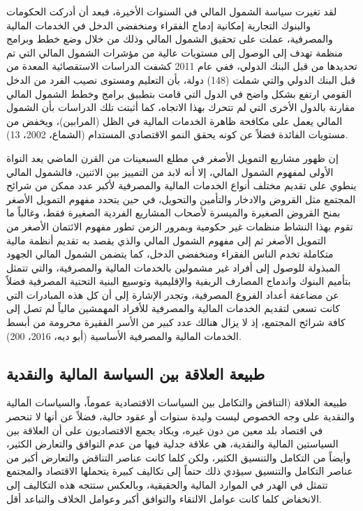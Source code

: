 \documentclass[10pt,a4paper]{report}
\begin{document}
\begin{doublespacing}
لقد تغيرت سياسة الشمول المالي في السنوات الأخيرة، فبعد أن أدركت الحكومات والبنوك التجارية إمكانية إدماج الفقراء ومنخفضي الدخل في الخدمات المالية والمصرفية، عملت على تحقيق الشمول المالي وذلك من خلال وضع خطط وبرامج منظمة تهدف إلى الوصول إلى مستويات عالية من مؤشرات الشمول المالي التي تم تحديدها من قبل البنك الدولي، ففي عام 2011 كشفت الدراسات الاستقصائية المعدة من قبل البنك الدولي والتي شملت (148) دولة، بأن التعليم ومستوى نصيب الفرد من الدخل القومي ارتفع بشكل واضح في الدول التي قامت بتطبيق برامج وخطط الشمول المالي مقارنة بالدول الأخرى التي لم تتحرك بهذا الاتجاه، كما أثبتت تلك الدراسات بأن الشمول المالي يعمل على مكافحة ظاهرة الخدمات المالية في الظل (المرابين)، ويخفض من مستويات الفائدة فضلاً عن كونه يحقق النمو الاقتصادي المستدام ({الشماع، 2002، 13}).

إن ظهور مشاريع التمويل الأصغر في مطلع السبعينات من القرن الماضي يعد النواة الأولى لمفهوم الشمول المالي، إلا أنه لابد من التمييز بين الاثنين، فالشمول المالي ينطوي على تقديم مختلف أنواع الخدمات المالية والمصرفية لأكبر عدد ممكن من شرائح المجتمع مثل القروض والادخار والتأمين والتحويل، في حين يتحدد مفهوم التمويل الأصغر بمنح القروض الصغيرة والميسرة لأصحاب المشاريع الفردية الصغيرة فقط، وغالباً ما تقوم بهذا النشاط منظمات غير حكومية وبمرور الزمن تطور مفهوم الائتمان الأصغر من التمويل الأصغر ثم إلى مفهوم الشمول المالي والذي يقصد به تقديم أنظمة مالية متكاملة تخدم الناس الفقراء ومنخفضي الدخل، كما يتضمن الشمول المالي الجهود المبذولة للوصول إلى أفراد غير مشمولين بالخدمات المالية والمصرفية، والتي تتمثل بتأميم البنوك واندماج المصارف الريفية والإقليمية وتوسيع البنية التحتية المصرفية فضلاً عن مضاعفة أعداد الفروع المصرفية، وتجدر الإشارة إلى أن كل هذه المبادرات التي كانت تسعى لتقديم الخدمات المالية والمصرفية للأفراد المهمشين مالياً لم تصل إلى كافة شرائح المجتمع، إذ لا يزال هنالك عدد كبير من الأسر الفقيرة محرومة من أبسط الخدمات المالية والمصرفية الأساسية ({أبو ديه، 2016، 200}).
\subsection{طبيعة العلاقة بين السياسة المالية والنقدية}
طبيعة العلاقة (التناقض والتكامل بين السياسات الاقتصادية عموماً، والسياسات المالية والنقدية على وجه الخصوص ليست وليدة سنوات أو عقود حالية، فضلاً عن أنها لا تنحصر في اقتصاد بلد معين من دون غيره، ويكاد يجمع الاقتصاديون على أن العلاقة بين السياستين المالية والنقدية، هي علاقة جدلية فيها من عدم التوافق والتعارض الكثير، وأيضاً من التكامل والتنسيق الكثير، ولكن كلما كانت عناصر التناقض والتعارض أكبر من عناصر التكامل والتنسيق سيؤدي ذلك حتماً إلى تكاليف كبيرة يتحملها الاقتصاد والمجتمع تتمثل في الهدر في الموارد المالية والحقيقية، وبالعكس ستتجه هذه التكاليف إلى الانخفاض كلما كانت عوامل الالتقاء والتوافق أكبر وعوامل الخلاف والتباعد أقل.


\end{doublespacing}
\end{document}
